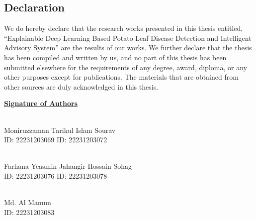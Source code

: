\begin{center}
    \section*{Declaration}
\end{center}
\large 

We do hereby declare that the research works presented in this thesis entitled, ``Explainable Deep Learning Based Potato Leaf Disease Detection and Intelligent Advisory System'' are the results of our works. We further declare that the thesis has been compiled and written by us, and no part of this thesis has been submitted elsewhere for the requirements of any degree, award, diploma, or any other purposes except for publications. The materials that are obtained from other sources are duly acknowledged in this thesis.

\vspace{10mm}
\begin{flushleft}

\textbf{\underline{Signature of Authors}} \null\hfill  

\vspace{10mm}

\underline{\hspace{5cm}} \null\hfill 
\underline{\hspace{5cm}}\\
Moniruzzaman \null\hfill   Tarikul Islam Sourav \\
ID: 22231203069  \null\hfill  ID: 22231203072 \\

\vspace{5mm}

\underline{\hspace{5cm}} \null\hfill 
\underline{\hspace{5cm}}\\
Farhana Yeasmin  \null\hfill   Jahangir Hossain Sohag\\
ID: 22231203076  \null\hfill  ID: 22231203078\\

\vspace{5mm}

\underline{\hspace{5cm}}\\
Md. Al Mamun\\
ID: 22231203083 \\ 

\end{flushleft}
